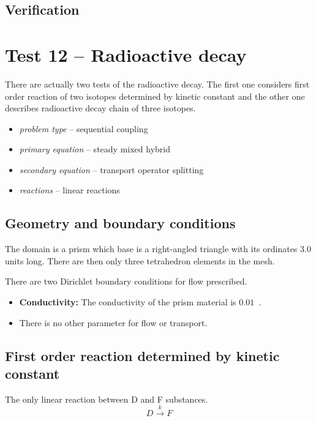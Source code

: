\subsection*{Verification}



\section{Test 12 -- Radioactive decay}
There are actually two tests of the radioactive decay. The first one considers first order reaction of two isotopes 
determined by kinetic constant and the other one describes radioactive decay chain of three isotopes.

\begin{itemize} 
    \item \emph{problem type} -- sequential coupling
    \item \emph{primary equation} -- steady mixed hybrid
    \item \emph{secondary equation} -- transport operator splitting
    \item \emph{reactions} -- linear reactions
  \end{itemize}

\subsection*{Geometry and boundary conditions}
The domain is a prism which base is a right-angled triangle with its ordinates 3.0 units long. There are then only three tetrahedron elements in the mesh.

There are two Dirichlet boundary conditions for flow prescribed.

\begin{itemize}
  \item \textbf{Conductivity:} The conductivity of the prism material is $0.01$~. 
  \item There is no other parameter for flow or transport.
\end{itemize}



\subsection{First order reaction determined by kinetic constant}
The only linear reaction between D and F substances.
\[
D\xrightarrow{k}F
\]

